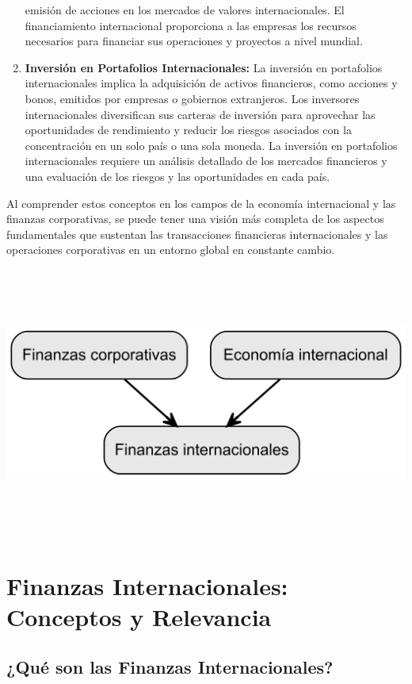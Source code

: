 \documentclass[
  a4paper,
]{article}
\begin{document}
\begin{enumerate}
  emisión de acciones en los mercados de valores internacionales. El
  financiamiento internacional proporciona a las empresas los recursos
  necesarios para financiar sus operaciones y proyectos a nivel mundial.
\item
  \textbf{Inversión en Portafolios Internacionales:} La inversión en
  portafolios internacionales implica la adquisición de activos
  financieros, como acciones y bonos, emitidos por empresas o gobiernos
  extranjeros. Los inversores internacionales diversifican sus carteras
  de inversión para aprovechar las oportunidades de rendimiento y
  reducir los riesgos asociados con la concentración en un solo país o
  una sola moneda. La inversión en portafolios internacionales requiere
  un análisis detallado de los mercados financieros y una evaluación de
  los riesgos y las oportunidades en cada país.
\end{enumerate}

Al comprender estos conceptos en los campos de la economía internacional
y las finanzas corporativas, se puede tener una visión más completa de
los aspectos fundamentales que sustentan las transacciones financieras
internacionales y las operaciones corporativas en un entorno global en
constante cambio.

\includegraphics[width=5.5in,height=3.5in]{index_files/figure-latex/dot-figure-1.png}

\section{Finanzas Internacionales: Conceptos y
Relevancia}\label{finanzas-internacionales-conceptos-y-relevancia}

\subsection{¿Qué son las Finanzas
Internacionales?}\label{quuxe9-son-las-finanzas-internacionales}
\end{document}
